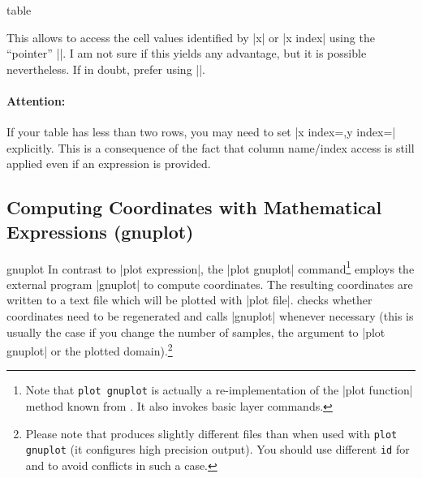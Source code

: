 {\begin{addplotoperation}[]{table}{}
\begin{enumerate}
            This allows to access the cell values identified by |x| or
            |x index| using the ``pointer'' |\columnx|. I am not sure if this
            yields any advantage, but it is possible nevertheless. If in
            doubt, prefer using |\thisrow|.
    \end{enumerate}

    \paragraph{Attention:}

    If your table has less than two rows, you may need to set
    |x index={},y index={}| explicitly. This is a consequence of the fact that
    column name/index access is still applied even if an expression is provided.
\end{addplotoperation}


\subsection{Computing Coordinates with Mathematical Expressions (gnuplot)}

\begin{addplotoperation}[]{gnuplot}{}
    In contrast to |plot expression|, the |plot gnuplot| command\footnote{Note
    that \texttt{plot gnuplot} is actually a re-implementation of the
    |plot function| method known from \PGF{}. It also invokes \PGF{} basic
    layer commands.} employs the external program |gnuplot| to compute
    coordinates. The resulting coordinates are written to a text file which
    will be plotted with |plot file|. \PGF{} checks whether coordinates need to
    be regenerated and calls |gnuplot| whenever necessary (this is usually the
    case if you change the number of samples, the argument to |plot gnuplot| or
    the plotted domain).\footnote{Please note that \PGFPlots{} produces
    slightly different files than \Tikz{} when used with \texttt{plot gnuplot}
    (it configures high precision output). You should use different \texttt{id}
    for \PGFPlots{} and \Tikz{} to avoid conflicts in such a case.}


\end{addplotoperation}}
